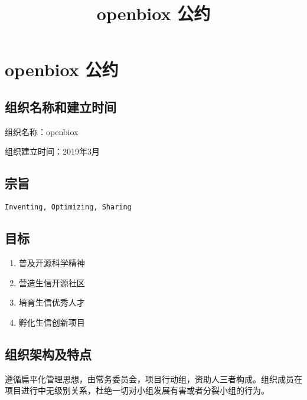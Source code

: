 \documentclass[]{article}
\title{openbiox 公约}
\author{}
\date{}
\providecommand{\tightlist}{%
  \setlength{\itemsep}{0pt}\setlength{\parskip}{0pt}}
\begin{document}
\maketitle

\section{openbiox 公约}\label{openbiox-}

\subsection{组织名称和建立时间}

组织名称：openbiox

组织建立时间：2019年3月

\subsection{宗旨}

\texttt{Inventing,\ Optimizing,\ Sharing}

\subsection{目标}

\begin{enumerate}
\def\labelenumi{\arabic{enumi}.}
\tightlist
\item
  普及开源科学精神
\item
  营造生信开源社区
\item
  培育生信优秀人才
\item
  孵化生信创新项目
\end{enumerate}

\subsection{组织架构及特点}

遵循扁平化管理思想，由常务委员会，项目行动组，资助人三者构成。组织成员在项目进行中无级别关系，杜绝一切对小组发展有害或者分裂小组的行为。
\end{document}
